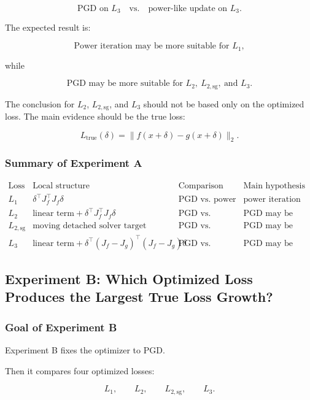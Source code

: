 \documentclass{article}
\begin{document}
\[
\text{PGD on } L_3
\quad
\text{vs.}
\quad
\text{power-like update on } L_3.
\]

The expected result is:

\[
\text{Power iteration may be more suitable for } L_1,
\]

while

\[
\text{PGD may be more suitable for } L_2,\ L_{2,\mathrm{sg}},\ \text{and } L_3.
\]

The conclusion for \(L_2\), \(L_{2,\mathrm{sg}}\), and \(L_3\) should not be based only on the optimized loss. The main evidence should be the true loss:

\[
L_{\mathrm{true}}(\delta)
=
\|f(x+\delta)-g(x+\delta)\|_2.
\]

\subsubsection{Summary of Experiment A}

\[
\begin{array}{c|c|c|c}
\text{Loss} & \text{Local structure} & \text{Comparison} & \text{Main hypothesis} \\
\hline
L_1
&
\delta^\top J_f^\top J_f\delta
&
\text{PGD vs. power iteration}
&
\text{power iteration may be more suitable}
\\
L_2
&
\text{linear term}+\delta^\top J_f^\top J_f\delta
&
\text{PGD vs. power-like}
&
\text{PGD may be more suitable}
\\
L_{2,\mathrm{sg}}
&
\text{moving detached solver target}
&
\text{PGD vs. power-like}
&
\text{PGD may be more suitable}
\\
L_3
&
\text{linear term}+\delta^\top(J_f-J_g)^\top(J_f-J_g)\delta
&
\text{PGD vs. power-like}
&
\text{PGD may be more suitable}
\end{array}
\]

\subsection{Experiment B: Which Optimized Loss Produces the Largest True Loss Growth?}

\subsubsection{Goal of Experiment B}

Experiment B fixes the optimizer to PGD.

Then it compares four optimized losses:

\[
L_1,
\qquad
L_2,
\qquad
L_{2,\mathrm{sg}},
\qquad
L_3.
\]
\end{document}
